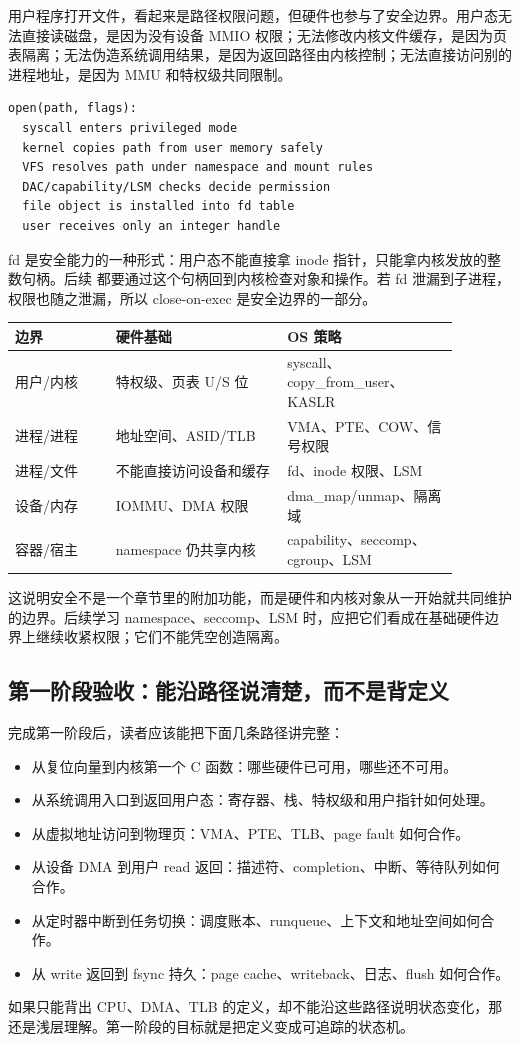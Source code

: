 用户程序打开文件，看起来是路径权限问题，但硬件也参与了安全边界。用户态无法直接读磁盘，是因为没有设备 MMIO 权限；无法修改内核文件缓存，是因为页表隔离；无法伪造系统调用结果，是因为返回路径由内核控制；无法直接访问别的进程地址，是因为 MMU 和特权级共同限制。

\begin{lstlisting}
open(path, flags):
  syscall enters privileged mode
  kernel copies path from user memory safely
  VFS resolves path under namespace and mount rules
  DAC/capability/LSM checks decide permission
  file object is installed into fd table
  user receives only an integer handle
\end{lstlisting}

fd 是安全能力的一种形式：用户态不能直接拿 inode 指针，只能拿内核发放的整数句柄。后续  都要通过这个句柄回到内核检查对象和操作。若 fd 泄漏到子进程，权限也随之泄漏，所以 close-on-exec 是安全边界的一部分。

\begin{longtable}{p{0.2\linewidth}p{0.34\linewidth}p{0.34\linewidth}}
\toprule
边界 & 硬件基础 & OS 策略 \\
\midrule
用户/内核 & 特权级、页表 U/S 位 & syscall、copy\_from\_user、KASLR \\
进程/进程 & 地址空间、ASID/TLB & VMA、PTE、COW、信号权限 \\
进程/文件 & 不能直接访问设备和缓存 & fd、inode 权限、LSM \\
设备/内存 & IOMMU、DMA 权限 & dma\_map/unmap、隔离域 \\
容器/宿主 & namespace 仍共享内核 & capability、seccomp、cgroup、LSM \\
\bottomrule
\end{longtable}

这说明安全不是一个章节里的附加功能，而是硬件和内核对象从一开始就共同维护的边界。后续学习 namespace、seccomp、LSM 时，应把它们看成在基础硬件边界上继续收紧权限；它们不能凭空创造隔离。

\subsection{第一阶段验收：能沿路径说清楚，而不是背定义}

完成第一阶段后，读者应该能把下面几条路径讲完整：

\begin{itemize}
\tightlist
\item 从复位向量到内核第一个 C 函数：哪些硬件已可用，哪些还不可用。
\item 从系统调用入口到返回用户态：寄存器、栈、特权级和用户指针如何处理。
\item 从虚拟地址访问到物理页：VMA、PTE、TLB、page fault 如何合作。
\item 从设备 DMA 到用户 read 返回：描述符、completion、中断、等待队列如何合作。
\item 从定时器中断到任务切换：调度账本、runqueue、上下文和地址空间如何合作。
\item 从 write 返回到 fsync 持久：page cache、writeback、日志、flush 如何合作。
\end{itemize}

如果只能背出 CPU、DMA、TLB 的定义，却不能沿这些路径说明状态变化，那还是浅层理解。第一阶段的目标就是把定义变成可追踪的状态机。

